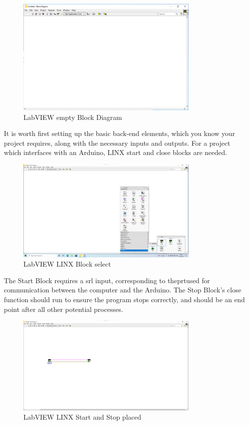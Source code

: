 \documentclass[a4paper,11pt]{report}
\begin{document}
\begin{figure}[H]
\centering
\includegraphics[width=0.8\textwidth]{screenshots/labview4}
\caption{LabVIEW empty Block Diagram}
\end{figure}

It is worth first setting up the basic back-end elements, which you know your project requires, along with the necessary inputs and outputs. For a project which interfaces with an Arduino, LINX start and close blocks are needed.

\begin{figure}[H]
\centering
\includegraphics[width=0.8\textwidth]{screenshots/labview6}
\caption{LabVIEW LINX Block select}
\end{figure}

The Start Block requires a \gls{srl} input, corresponding to the\gls{prt}used for communication between the computer and the Arduino. The Stop Block's close function should run to ensure the program stops correctly, and should be an end point after all other potential processes.

\begin{figure}[H]
\centering
\includegraphics[width=0.8\textwidth]{screenshots/labview7}
\caption{LabVIEW LINX Start and Stop placed}
\end{figure}
\end{document}
